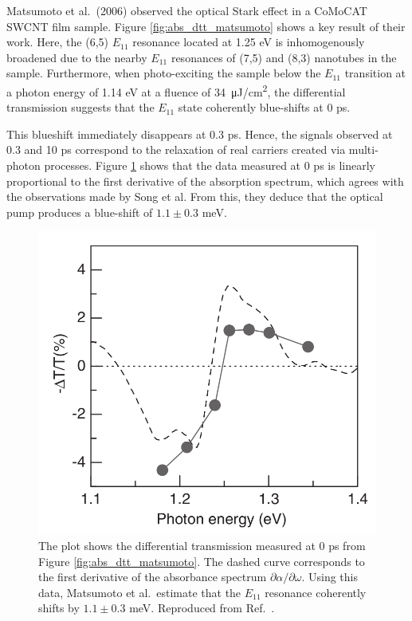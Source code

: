 Matsumoto et al.\ (2006) observed the optical Stark effect in a CoMoCAT SWCNT film sample. Figure \ref{fig:abs_dtt_matsumoto} shows a key result of their work. Here, the (6,5) $E_{11}$ resonance located at 1.25 eV is inhomogenously broadened due to the nearby $E_{11}$ resonances of (7,5) and (8,3) nanotubes in the sample. Furthermore, when photo-exciting the sample below the $E_{11}$ transition at a photon energy of 1.14 eV at a fluence of \SI{34}{\micro \joule / \cm\squared}, the differential transmission suggests that the $E_{11}$ state coherently blue-shifts at 0 ps.

This blueshift immediately disappears at 0.3 ps. Hence, the signals observed at 0.3 and 10 ps correspond to the relaxation of real carriers created via multi-photon processes. Figure \ref{fig:dtt_matsumoto} shows that the data measured at 0 ps is linearly proportional to the first derivative of the absorption spectrum, which agrees with the observations made by Song et al. From this, they deduce that the optical pump produces a blue-shift of $1.1 \pm 0.3$ meV.

\begin{figure}[ht]
	\centering
	\includegraphics[scale=0.3]{images/chapter_prior_works/dtt_matsumoto}
	\caption{The plot shows the differential transmission measured at 0 ps from Figure \ref{fig:abs_dtt_matsumoto}. The dashed curve corresponds to the first derivative of the absorbance spectrum $\partial \alpha / \partial \omega$. Using this data, Matsumoto et al.\ estimate that the $E_{11}$ resonance coherently shifts by $1.1 \pm 0.3$ meV. Reproduced from Ref.\ \cite{matsumoto2006optical}.}
	\label{fig:dtt_matsumoto}
\end{figure}


